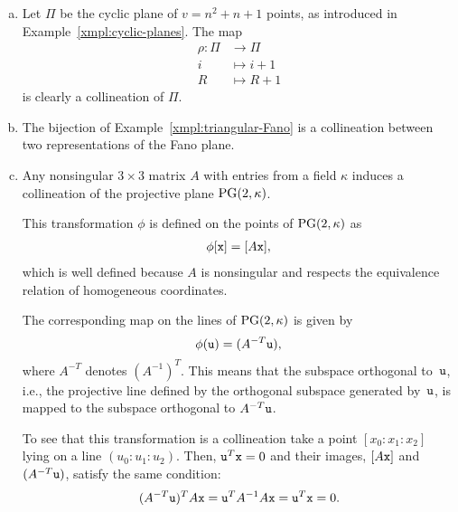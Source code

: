 \begin{xmpls}\label{xmpl:a-cyclic-collineation}${}$
    \begin{enumerate}[a),font=\upshape]
        \item Let $\Pi$ be the cyclic plane of $v=n^2+n+1$ points, as introduced in Example~\ref{xmpl:cyclic-planes}. The map
        \begin{align*}
            \rho\colon\Pi&\to\Pi\\
            i&\mapsto i+1\\
            R&\mapsto R+1
        \end{align*}
        is clearly a collineation of $\Pi$.

        \item The bijection of Example~\ref{xmpl:triangular-Fano} is a collineation between two representations of the Fano plane.

        \item Any nonsingular\/ $3 \times 3$ matrix\/ $A$ with entries from a field\/ $\kappa$ induces a collineation of the projective plane\/ $\operatorname{PG}(2,\kappa)$.

        This transformation\/ $\phi$ is defined on the points of\/ $\operatorname{PG}(2,\kappa)$ as
        \begin{align*}
            \phi[\mathtt x]=[A\mathtt x],
        \end{align*}
        which is well defined because $A$ is nonsingular and respects the equivalence relation of homogeneous coordinates.
        
        The corresponding map on the lines of $\operatorname{PG}(2,\kappa)$ is given by
        \[
            \phi(\mathtt u)=(A^{-T}\mathtt u),
        \]
        where $A^{-T}$ denotes $(A^{-1})^T$. This means that the subspace orthogonal to~$\mathtt u$, i.e., the projective line defined by the orthogonal subspace generated by~$\mathtt u$, is mapped to the subspace orthogonal to $A^{-T}\mathtt u$.
        
        To see that this transformation is a collineation take a point $[x_0:x_1:x_2]$ lying on a line $(u_0:u_1:u_2)$. Then, $\mathtt u^T\mathtt x=0$ and their images, $[A\mathtt x]$ and $(A^{-T}\mathtt u)$, satisfy the same condition:
        \[
            (A^{-T}\mathtt u)^TA\mathtt x
                = \mathtt u^T A^{-1}A\mathtt x
                = \mathtt u^T\mathtt x = 0.
        \]
    \end{enumerate}
\end{xmpls}

